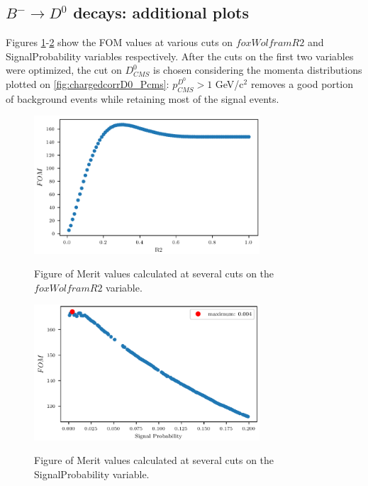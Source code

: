 %

\subsection{$B^- \rightarrow D^0$ decays: additional plots}
\label{chargedBtoD0App}

Figures \ref{fig:chargedBtoD_FOMvsR2_cut}-\ref{fig:chargedBtoD_FOMvsSigProb_cut} show the FOM values at various cuts 
on $foxWolframR2$ and SignalProbability variables respectively. After the cuts on the first two variables were optimized, the cut on $D^0_{CMS}$ is chosen 
considering the momenta distributions plotted on \ref{fig:chargedcorrD0_Pcms}: $p^{D^0 }_{CMS} > 1$ GeV/c$^2$ removes 
a good portion of background events while retaining most of the signal events.

\begin{figure}[H]
  {\includegraphics[width=0.75\textwidth]{A2-Appendix/figs/R2Optimisation_chargedB_D0Sample.png}}
  \caption{Figure of Merit values calculated at several cuts on the $foxWolframR2$ variable.}
  \label{fig:chargedBtoD_FOMvsR2_cut}
  \end{figure}
   


\begin{figure}[H]
    {\includegraphics[width=0.75\textwidth]{A2-Appendix/figs/SigProbOptimisation_chargedB_D0Sample.png}}
    \caption{Figure of Merit values calculated at several cuts on the SignalProbability variable.}
    \label{fig:chargedBtoD_FOMvsSigProb_cut}
\end{figure}

